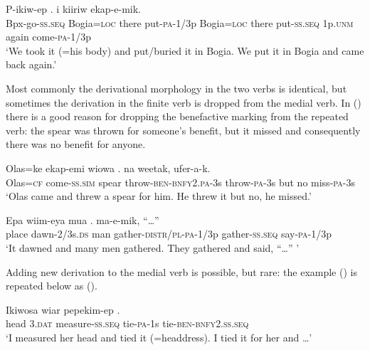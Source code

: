 \ea%
\label{ex:x1508}
\gll P-ikiw-ep    .      i  kiiriw  ekap-e-mik. \\
Bpx-go-\textsc{ss}.\textsc{seq} Bogia=\textsc{loc} there put-\textsc{pa}-1/3p Bogia=\textsc{loc} there  put-\textsc{ss}.\textsc{seq} 1p.\textsc{\textsc{unm}} again come-\textsc{\textsc{pa}}-1/3p     \\
\glt`We took it (=his body) and put/buried it in Bogia. We put it in Bogia and came back again.'
\z


Most commonly the derivational morphology in the two verbs is identical, but sometimes the derivation in the finite verb is dropped from the medial verb. In () there is a good reason for dropping the benefactive marking from the repeated verb: the spear was thrown for someone's benefit, but it missed and consequently there was no benefit for anyone.

\ea%
\label{ex:x1513}
\gll Olas=ke  ekap-emi  wiowa  .   na  weetak,  ufer-a-k. \\
Olas=\textsc{cf}  come-\textsc{ss}.\textsc{sim} spear throw-\textsc{ben}-\textsc{bnfy}2.\textsc{pa}-3s throw-\textsc{pa}-3s  but  no  miss-\textsc{pa}-3s     \\
\glt`Olas came and threw a spear for him. He threw it but no, he missed.'
\z


\ea%
\label{ex:x1514}
\gll Epa  wiim-eya  mua  .   ma-e-mik,  ``{\dots''}\\
place  dawn-2/3s.\textsc{ds} man  gather-\textsc{distr}/\textsc{pl}-\textsc{pa}-1/3p gather-\textsc{ss}.\textsc{seq} say-\textsc{pa}-1/3p\\
\glt`It dawned and many men gathered. They gathered and said, ``{\dots}'' '
\z


Adding new derivation to the medial verb is possible, but rare: the example () is repeated below as ().

\ea%
\label{ex:x1515}
\gll Ikiwosa  wiar  pepekim-ep  .   \\
head  3.\textsc{dat} measure-\textsc{ss}.\textsc{seq} tie-\textsc{pa}-1s  tie-\textsc{ben}-\textsc{bnfy}2.\textsc{ss}.\textsc{seq}\\
\glt`I measured her head and tied it (=headdress). I tied it for her and {\dots}'
\z


